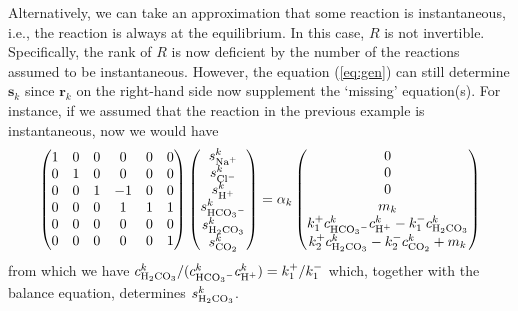 \documentclass{article}
\begin{document}
Alternatively, we can take an approximation that some reaction is instantaneous, i.e., the reaction is always at the equilibrium.
In this case, $R$ is not invertible.
Specifically, the rank of $R$ is now deficient by the number of the reactions assumed to be instantaneous.
However, the equation (\ref{eq:gen}) can still determine $\mathbf{s}_k$ since $\mathbf{r}_k$ on the right-hand side now supplement the `missing' equation(s).
For instance, if we assumed that the reaction  in the previous example is instantaneous, now we would have
\begin{equation*}
    \begin{pmatrix}
        1 & 0 & 0 & 0 & 0 & 0\\
        0 & 1 & 0 & 0 & 0 & 0\\
        0 & 0 & 1 & -1& 0 & 0\\
        0 & 0 & 0 & 1 & 1 & 1\\
        0 & 0 & 0 & 0 & 0 & 0\\
        0 & 0 & 0 & 0 & 0 & 1\\
    \end{pmatrix}
    \begin{pmatrix}
        s_{\ce{Na+}}^k \\  s_{\ce{Cl-}}^k \\ s_{\ce{H+}}^k \\ s_{\ce{HCO3-}}^k \\ s_{\ce{H2CO3}}^k \\ s_{\ce{CO2}}^k
    \end{pmatrix}
    = \alpha_k\begin{pmatrix}
        0 \\ 0 \\ 0 \\ m_k \\ k_1^+c_{\ce{HCO3-}}^kc_{\ce{H+}}^k-k_1^-c_{\ce{H2CO3}}^k\\
        k_2^+c_{\ce{H2CO3}}^k - k_2^-c_{\ce{CO2}}^k+m_k
    \end{pmatrix}
\end{equation*}
    from which we have $c^k_{\ce{H2CO3}}/(c^k_{\ce{HCO3-}}c^k_{\ce{H+}}) = k_1^+/k_1^-$ which, together with the balance equation, determines $s_{\ce{H2CO3}}^k$.
\end{document}
